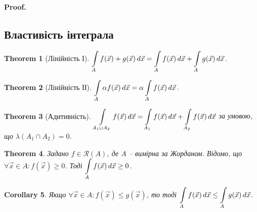 \documentclass[a4paper, 10pt]{article}
\makeatletter
\def\huge{\displaystyle}
\def\qed{$\blacksquare$}
\theoremstyle{theoremdd}
\newtheorem{theorem}{Theorem}[subsection]
\theoremstyle{theoremdd}
\theoremstyle{theoremdd}
\theoremstyle{theoremdd}
\theoremstyle{theoremdd}
\theoremstyle{theoremdd}
\theoremstyle{theoremdd}
\theoremstyle{theoremdd}
\theoremstyle{theoremdd}
\theoremstyle{theoremdd}
\theoremstyle{theoremdd}
\theoremstyle{theoremdd}
\theoremstyle{theoremdd}
\theoremstyle{theoremdd}
\newtheorem{corollary}[theorem]{Corollary}
\theoremstyle{theoremdd}
\renewenvironment{proof}[1][Proof.\\]{\par
\pushQED{\hfill \qed}%
\normalfont \topsep6\p@\@plus6\p@\relax
\trivlist
\item\relax
{\bfseries
#1\@addpunct{.}}\hspace\labelsep\ignorespaces
}{%
\popQED\endtrivlist\@endpefalse
}
\makeatother
\begin{document}
\begin{proof}
\iffalse
підрозбиття $\tilde{\tau} = \{R_1,\dots,R_p\}$, причому $|\tilde{\tau}| \leq |\tau| < \delta$. Тоді\\
$\sigma(\mathbbm{1}_A f, \tilde{\tau}, \xi) = \displaystyle\sum_{k} \mathbbm{1}_A(\vec{x}_k) f(\vec{x}_k) m(R_k) = \sum_k f(\vec{x}_k) m(Q_k \cap A)$.\\
У кінці залишилися тільки ті відмічені точки, які потрапили в $A$ через індикатор. Але зазначимо, що $\sigma(\mathbbm{1}_A f,\tilde{\tau},\xi) = \sigma(f,\tau_A,\xi_A)$, де $\tau_A = \{Q_i \cap A\}$ та $\xi_A$ -- відмічені точки з $\xi$, які лежать в $A$.\\
Отже, $|\sigma(f,\tau_A,\xi_A) - I| < \varepsilon$.
\fi
\fi
\end{proof}

\subsection{Властивість інтеграла}
\begin{theorem}[Лінійність І]
$\huge\int\displaylimits_A f(\vec{x})+g(\vec{x})\,d\vec{x} = \int\displaylimits_A f(\vec{x})\,d\vec{x} + \int\displaylimits_A g(\vec{x})\,d\vec{x}$.
\end{theorem}

\begin{theorem}[Лінійність ІІ]
$\huge\int\displaylimits_A \alpha f(\vec{x})\,d\vec{x} = \alpha \int\displaylimits_A f(\vec{x})\,d\vec{x}$.\\
\end{theorem}

\begin{theorem}[Адитивність]
$\huge\int\displaylimits_{A_1 \cup A_2} f(\vec{x})\,d\vec{x} = \int\displaylimits_{A_1} f(\vec{x})\,d\vec{x} + \int\displaylimits_{A_2} f(\vec{x})\,d\vec{x}$ за умовою, що $\lambda(A_1 \cap A_2) = 0$.
\end{theorem}

\begin{theorem}
Задано $f \in \mathcal{R}(A)$, де $A$ -- вимірна за Жорданом. Відомо, що $\forall \vec{x} \in A: f(\vec{x}) \geq 0$. Тоді $\huge\int\displaylimits_A f(\vec{x})\,d\vec{x} \geq 0$.
\end{theorem}

\begin{corollary}
Якщо $\forall \vec{x} \in A: f(\vec{x}) \leq g(\vec{x})$, то тоді $\huge\int\displaylimits_A f(\vec{x})\,d\vec{x} \leq \int\displaylimits_A g(\vec{x})\,d\vec{x}$.
\end{corollary}
\end{document}
